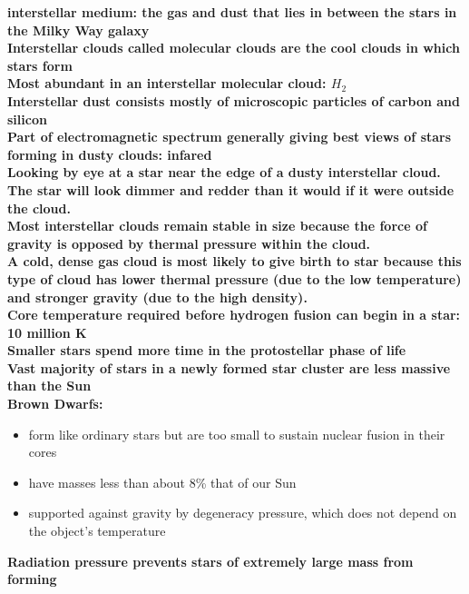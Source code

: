\bf{interstellar medium}: the gas and dust that lies in between the stars in the Milky Way galaxy\\
Interstellar clouds called molecular clouds are the cool clouds in which stars form\\
Most abundant in an interstellar molecular cloud: $H_2$ \\
\bf{Interstellar dust} consists mostly of microscopic particles of carbon and silicon \\
Part of electromagnetic spectrum generally giving best views of stars forming in dusty clouds: \bf{infared} \\
Looking by eye at a star near the edge of a dusty interstellar cloud. The star will look \bf{dimmer and redder} than it would if it were outside the cloud.\\
Most interstellar clouds remain stable in size because the force of gravity is opposed by \bf{thermal pressure} within the cloud.\\
A cold, dense gas cloud is most likely to give birth to star because this type of cloud has lower thermal pressure (due to the low temperature) and stronger gravity (due to the high density). \\
Core temperature required before hydrogen fusion can begin in a star: 10 million K \\
Smaller stars spend more time in the protostellar phase of life \\
Vast majority of stars in a newly formed star cluster are \bf{less massive than the Sun}\\
Brown Dwarfs:
\begin{itemize}
\item form like ordinary stars but are too small to sustain nuclear fusion in their cores
\item have masses less than about 8\% that of our Sun
\item supported against gravity by degeneracy pressure, which does not depend on the object's temperature
\end{itemize}
\bf{Radiation pressure} prevents stars of extremely large mass from forming\\

